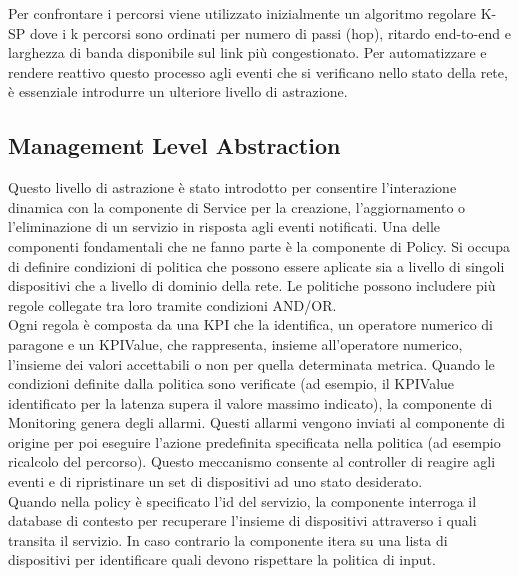 Per confrontare i percorsi viene utilizzato inizialmente un algoritmo regolare K-SP dove i k percorsi sono ordinati per numero di passi (hop), ritardo end-to-end e larghezza di banda disponibile sul link più congestionato. 
Per automatizzare e rendere reattivo questo processo agli eventi che si verificano nello stato della rete, è essenziale introdurre un ulteriore livello di astrazione.

\subsection{Management Level Abstraction}
Questo livello di astrazione è stato introdotto per consentire l'interazione dinamica con la componente di Service per la creazione, l'aggiornamento o l'eliminazione di un servizio in risposta agli eventi notificati.
Una delle componenti fondamentali che ne fanno parte è la componente di Policy.
Si occupa di definire condizioni di politica che possono essere aplicate sia a livello di singoli dispositivi che a livello di dominio della rete.
Le politiche possono includere più regole collegate tra loro tramite condizioni AND/OR.
\\Ogni regola è composta da una KPI che la identifica, un operatore numerico di paragone e un KPIValue, che rappresenta, insieme all'operatore numerico, l'insieme dei valori accettabili o non per quella determinata metrica.
Quando le condizioni definite dalla politica sono verificate (ad esempio, il KPIValue identificato per la latenza supera il valore massimo indicato), la componente di Monitoring
genera degli allarmi. Questi allarmi vengono inviati al componente di origine per poi eseguire l'azione predefinita specificata nella politica (ad esempio ricalcolo del percorso).
Questo meccanismo consente al controller di reagire agli eventi e di ripristinare un set di dispositivi ad uno stato desiderato.
\\Quando nella policy è specificato l'id del servizio, la componente interroga il database di contesto per recuperare l'insieme di dispositivi attraverso i quali transita il servizio.
In caso contrario la componente itera su una lista di dispositivi per identificare quali devono rispettare la politica di input.
